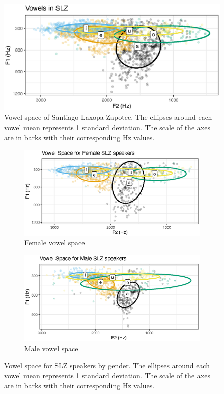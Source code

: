 \begin{figure}[h!]
    \centering
    \includegraphics[width = 0.9\linewidth]{images/slz_vowels.eps}
    \caption{Vowel space of Santiago Laxopa Zapotec. The ellipses around each vowel mean represents 1 standard deviation. The scale of the axes are in barks with their corresponding Hz values.}
    \label{fig:SLZvowels}
\end{figure}

\begin{figure}[h!]
	\centering
	\begin{subfigure}{.5\textwidth}
		\centering
		\includegraphics[width=\linewidth]{images/slz_vowels_f.eps}
		\caption{Female vowel space}
		\label{fig:slz_vowels_f}
	\end{subfigure}%
	\begin{subfigure}{.5\textwidth}
		\centering
		\includegraphics[width=\linewidth]{images/slz_vowels_m.eps}
		\caption{Male vowel space}
		\label{fig:slz_vowels_m}
	\end{subfigure}	
	\caption{Vowel space for SLZ speakers by gender. The ellipses around each vowel mean represents 1 standard deviation. The scale of the axes are in barks with their corresponding Hz values.}
	\label{fig:slz_vowels}
\end{figure}

